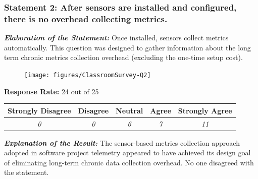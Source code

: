 

\clearpage
\subsubsection{Statement 2: After sensors are installed and configured, there is no overhead collecting metrics.}

\textbf{\textit{Elaboration of the Statement:}}
Once installed, sensors collect metrics automatically. This question was designed to gather information about the long term chronic metrics collection overhead (excluding the one-time setup cost).

\begin{quote}\end{quote} %

\begin{figure}[h]
  \center
  \texttt{[image: figures/ClassroomSurvey-Q2]}
  \label{fig:InClassSurvey-Q2}
\end{figure}

\begin{center}\textbf{Response Rate:} 24 out of 25\end{center}
\begin{table}[h]
	\centering
		\begin{tabular}{|c|c|c|c|c|} 
			\hline
			\textbf{Strongly Disagree} & \textbf{Disagree} & \textbf{Neutral} & \textbf{Agree} & \textbf{Strongly Agree} \\
			\hline
			\textit{0} & \textit{0} & \textit{6} & \textit{7} &\textit{11} \\
			\hline
		\end{tabular}
	\label{table:InClassSurvey-Q2}
\end{table}

\textbf{\textit{Explanation of the Result:}}
The sensor-based metrics collection approach adopted in software project telemetry appeared to have achieved its design goal of eliminating long-term chronic data collection overhead. No one disagreed with the statement.


